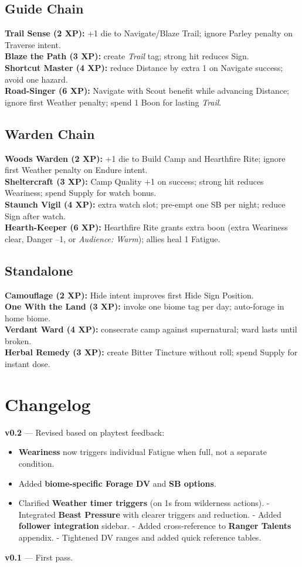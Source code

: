 \documentclass[11pt]{article}
\begin{document}
\subsection{Guide Chain}
\textbf{Trail Sense (2 XP):} +1 die to Navigate/Blaze Trail; ignore Parley penalty on Traverse intent.\\
\textbf{Blaze the Path (3 XP):} create \emph{Trail} tag; strong hit reduces Sign.\\
\textbf{Shortcut Master (4 XP):} reduce Distance by extra 1 on Navigate success; avoid one hazard.\\
\textbf{Road-Singer (6 XP):} Navigate with Scout benefit while advancing Distance; ignore first Weather penalty; spend 1 Boon for lasting \emph{Trail}.

\subsection{Warden Chain}
\textbf{Woods Warden (2 XP):} +1 die to Build Camp and Hearthfire Rite; ignore first Weather penalty on Endure intent.\\
\textbf{Sheltercraft (3 XP):} Camp Quality +1 on success; strong hit reduces Weariness; spend Supply for watch bonus.\\
\textbf{Staunch Vigil (4 XP):} extra watch slot; pre-empt one SB per night; reduce Sign after watch.\\
\textbf{Hearth-Keeper (6 XP):} Hearthfire Rite grants extra boon (extra Weariness clear, Danger --1, or \emph{Audience: Warm}); allies heal 1 Fatigue.

\subsection{Standalone}
\textbf{Camouflage (2 XP):} Hide intent improves first Hide Sign Position.\\
\textbf{One With the Land (3 XP):} invoke one biome tag per day; auto-forage in home biome.\\
\textbf{Verdant Ward (4 XP):} consecrate camp against supernatural; ward lasts until broken.\\
\textbf{Herbal Remedy (3 XP):} create Bitter Tincture without roll; spend Supply for instant dose.

\vfill
\section*{Changelog}
\textbf{v0.2} --- Revised based on playtest feedback:
\begin{itemize}
  \item \textbf{Weariness} now triggers individual Fatigue when full, not a separate condition.
  \item Added \textbf{biome-specific Forage DV} and \textbf{SB options}.
  \item Clarified \textbf{Weather timer triggers} (on 1s from wilderness actions).
  - Integrated \textbf{Beast Pressure} with clearer triggers and reduction.
  - Added \textbf{follower integration} sidebar.
  - Added cross-reference to \textbf{Ranger Talents} appendix.
  - Tightened DV ranges and added quick reference tables.
\end{itemize}
\textbf{v0.1} --- First pass.
\end{document}
